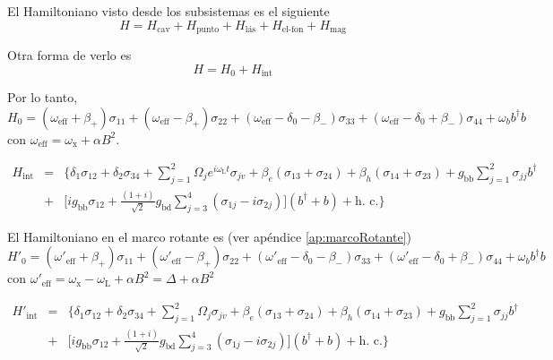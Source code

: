 \documentclass[../main.tex]{subfiles}
\begin{document}
El Hamiltoniano visto desde los subsistemas es el siguiente
\begin{equation}
	H = H_\text{cav} + H_\text{punto} + H_\text{l\'as} + H_\text{el-fon} + H_\text{mag}
\end{equation}

Otra forma de verlo es
\begin{equation}
	H = H_0 + H_\text{int}
\end{equation}

Por lo tanto,
\begin{equation}
	H_0 = (\omega_\text{eff} + \beta_+)\sigma_{11} + (\omega_\text{eff} - \beta_+)\sigma_{22} + (\omega_\text{eff} - \delta_0 - \beta_-)\sigma_{33} + (\omega_\text{eff} - \delta_0 + \beta_-)\sigma_{44} + \omega_b b^\dagger b 
\end{equation}
con $\omega_\text{eff} = \omega_\text{x} + \alpha B^2$.

\begin{eqnarray}
	H_\text{int} &=& \Big\{ \delta_1 \sigma_{12} + \delta_2 \sigma_{34} + \sum_{j=1}^2 \Omega_j e^{i\omega_\text{L} t} \sigma_{jv} + \beta_e (\sigma_{13} + \sigma_{24}) + \beta_h (\sigma_{14} + \sigma_{23}) + g_\text{bb} \sum_{j=1}^2 \sigma_{jj} b^\dagger \nonumber \\ &+& \big[ ig_\text{bb}\sigma_{12} + \tfrac{(1+i)}{\sqrt{2}} g_\text{bd} \sum_{j=3}^4 (\sigma_{1j} - i\sigma_{2j}) \big](b^\dagger + b) + \text{h. c.} \Big\}
\end{eqnarray}

El Hamiltoniano en el marco rotante es (ver apéndice \ref{ap:marcoRotante})
\begin{equation}
	H'_0 = (\omega'_\text{eff} + \beta_+)\sigma_{11} + (\omega'_\text{eff} - \beta_+)\sigma_{22} + (\omega'_\text{eff} - \delta_0 - \beta_-)\sigma_{33} + (\omega'_\text{eff} - \delta_0 + \beta_-)\sigma_{44} + \omega_b b^\dagger b
\end{equation}
con $\omega'_\text{eff} = \omega_\text{x} - \omega_\text{L} + \alpha B^2 = \Delta + \alpha B^2$

\begin{eqnarray}
	H'_\text{int} &=& \Big\{ \delta_1 \sigma_{12} + \delta_2 \sigma_{34} + \sum_{j=1}^2 \Omega_j \sigma_{jv} + \beta_e (\sigma_{13} + \sigma_{24}) + \beta_h (\sigma_{14} + \sigma_{23}) + g_\text{bb} \sum_{j=1}^2 \sigma_{jj} b^\dagger \nonumber \\ 
	&+& \big[ ig_\text{bb}\sigma_{12} + \tfrac{(1+i)}{\sqrt{2}} g_\text{bd} \sum_{j=3}^4 (\sigma_{1j} - i\sigma_{2j}) \big](b^\dagger + b) + \text{h. c.} \Big\}
\end{eqnarray}
\end{document}
